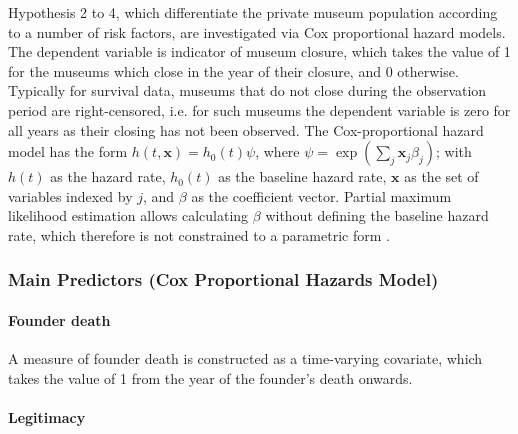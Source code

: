 \documentclass[12pt]{article}
\begin{document}
Hypothesis 2 to 4, which differentiate the private museum population according to a number of risk factors, are investigated via Cox proportional hazard models. 
The dependent variable is indicator of museum closure, which takes the value of 1 for the museums which close in the year of their closure, and 0 otherwise.
Typically for survival data, museums that do not close during the observation period are right-censored, i.e. for such museums the dependent variable is zero for all years as their closing has not been observed.
The Cox-proportional hazard model has the form \(h(t,\mathbf{x}) = h_0(t) \psi\), where \(\psi = \exp(\sum_{j} \mathbf{x}_j \beta_j)\); with \(h(t)\) as the hazard rate, \(h_0(t)\) as the baseline hazard rate, \(\mathbf{x}\) as the set of variables indexed by \(j\), and \(\beta\) as the coefficient vector.
Partial maximum likelihood estimation allows calculating \(\beta\) without defining the baseline hazard rate, which therefore is not constrained to a parametric form \parencite{Moore_2015_survival}.
\subsubsection*{Main Predictors (Cox Proportional Hazards Model)}


\paragraph*{Founder death}

A measure of founder death is constructed as a time-varying covariate, which takes the value of 1 from the year of the founder's death onwards.
\paragraph*{Legitimacy}
\end{document}
